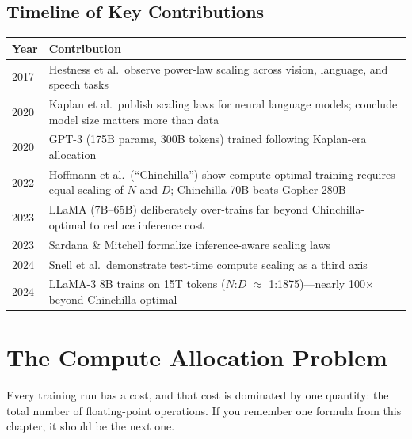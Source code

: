 \subsection*{Timeline of Key Contributions}

\begin{center}
\begin{tabularx}{\textwidth}{@{}lX@{}}
\toprule
\textbf{Year} & \textbf{Contribution} \\
\midrule
2017 & Hestness et al.\ observe power-law scaling across vision, language, and speech tasks \\
2020 & Kaplan et al.\ publish scaling laws for neural language models; conclude model size matters more than data \\
2020 & GPT-3 (175B params, 300B tokens) trained following Kaplan-era allocation \\
2022 & Hoffmann et al.\ (``Chinchilla'') show compute-optimal training requires equal scaling of $N$ and $D$; Chinchilla-70B beats Gopher-280B \\
2023 & LLaMA (7B--65B) deliberately over-trains far beyond Chinchilla-optimal to reduce inference cost \\
2023 & Sardana \& Mitchell formalize inference-aware scaling laws \\
2024 & Snell et al.\ demonstrate test-time compute scaling as a third axis \\
2024 & LLaMA-3 8B trains on 15T tokens ($N$:$D$ $\approx$ 1:1875)---nearly 100$\times$ beyond Chinchilla-optimal \\
\bottomrule
\end{tabularx}
\end{center}



\section{The Compute Allocation Problem}
\label{sec:compute-allocation}

Every training run has a cost, and that cost is dominated by one quantity: the total number of floating-point operations. If you remember one formula from this chapter, it should be the next one.

